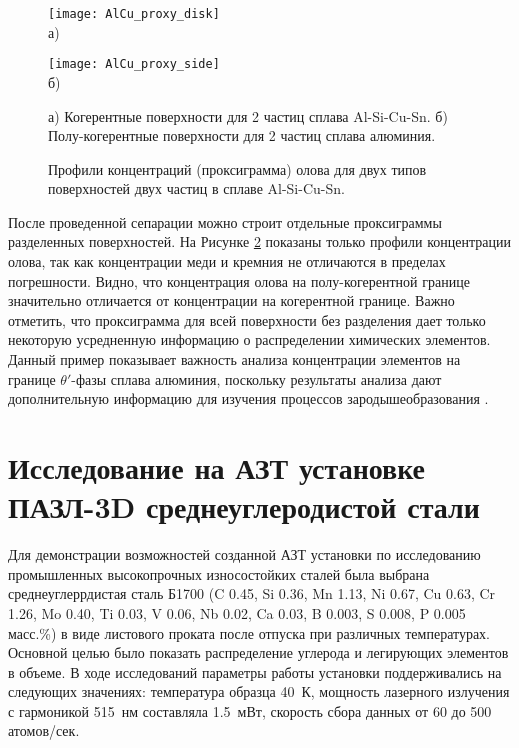 \begin{figure}[htb]
	\begin{minipage}[b][][b]{0.49\textwidth}\centering
		\texttt{[image: AlCu\_proxy\_disk]} \\ а)
	\end{minipage}
	\begin{minipage}[b][][b]{0.49\textwidth}\centering
		\texttt{[image: AlCu\_proxy\_side]} \\ б)
	\end{minipage}
	\caption{а) Когерентные поверхности для 2 частиц сплава Al-Si-Cu-Sn. б) Полу-когерентные поверхности для 2 частиц сплава алюминия.}
	\label{fig:AlCu_proxy_disk_side}
\end{figure}

\begin{figure}[htb]
	\caption{Профили концентраций (проксиграмма) олова для двух типов поверхностей двух частиц в сплаве Al-Si-Cu-Sn.}
	\label{fig:AlCu_Sn_proxy}
\end{figure}

\FloatBarrier

После проведенной сепарации можно строит отдельные проксиграммы разделенных поверхностей. На Рисунке \cref{fig:AlCu_Sn_proxy} показаны только профили концентрации олова, так как концентрации меди и кремния не отличаются в пределах погрешности. Видно, что концентрация олова на полу-когерентной границе значительно отличается от концентрации на когерентной границе. Важно отметить, что проксиграмма для всей поверхности без разделения дает только некоторую усредненную информацию о распределении химических элементов. Данный пример показывает важность анализа концентрации элементов на границе $\theta '$-фазы сплава алюминия, поскольку результаты анализа дают дополнительную информацию для изучения процессов зародышеобразования \cite{Akopyan2022A319}.





\FloatBarrier

\section{Исследование на АЗТ установке ПАЗЛ-3D среднеуглеродистой стали}\label{sec:ch4/sect2}

Для демонстрации возможностей созданной АЗТ установки по исследованию промышленных высокопрочных износостойких сталей была выбрана среднеуглеррдистая сталь Б1700 (C 0.45, Si 0.36, Mn 1.13, Ni 0.67, Cu 0.63, Cr 1.26, Mo 0.40, Ti 0.03, V 0.06, Nb 0.02, Ca 0.03, B 0.003, S 0.008, P 0.005 масс.\%) в виде листового проката после отпуска при различных температурах. Основной целью было показать распределение углерода и легирующих элементов в объеме. В ходе исследований параметры работы установки поддерживались на следующих значениях: температура образца 40~К, мощность лазерного излучения с гармоникой 515~нм составляла 1.5~мВт, скорость сбора данных от 60 до 500 атомов/сек.

